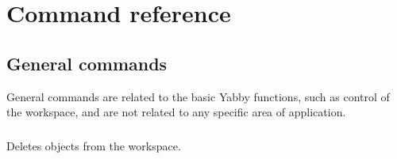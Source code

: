 

\setcounter{section}{0}

\chapter{Command reference}

\section{General commands}

General commands are related to the basic Yabby functions, such as
control of the workspace, and are not related to any specific area
of application. 


\subsection[delete]{  }



Deletes objects from the workspace.


